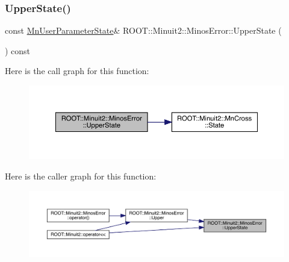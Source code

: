 \subsubsection{\texorpdfstring{UpperState()}{UpperState()}\hspace{0.1cm}{\footnotesize\ttfamily [2/2]}}
{\footnotesize\ttfamily const \mbox{\hyperlink{classROOT_1_1Minuit2_1_1MnUserParameterState}{Mn\+User\+Parameter\+State}}\& R\+O\+O\+T\+::\+Minuit2\+::\+Minos\+Error\+::\+Upper\+State (\begin{DoxyParamCaption}{ }\end{DoxyParamCaption}) const\hspace{0.3cm}{\ttfamily [inline]}}

Here is the call graph for this function\+:
\nopagebreak
\begin{figure}[H]
\begin{center}
\leavevmode
\includegraphics[width=350pt]{d2/dd1/classROOT_1_1Minuit2_1_1MinosError_a89164c38dd7596c3164f1083eb9aac72_cgraph}
\end{center}
\end{figure}
Here is the caller graph for this function\+:\nopagebreak
\begin{figure}[H]
\begin{center}
\leavevmode
\includegraphics[width=350pt]{d2/dd1/classROOT_1_1Minuit2_1_1MinosError_a89164c38dd7596c3164f1083eb9aac72_icgraph}
\end{center}
\end{figure}
\mbox{\label{classROOT_1_1Minuit2_1_1MinosError_a4180ae7ff87d9a2c0942c8e6ac81a8c0}} 
